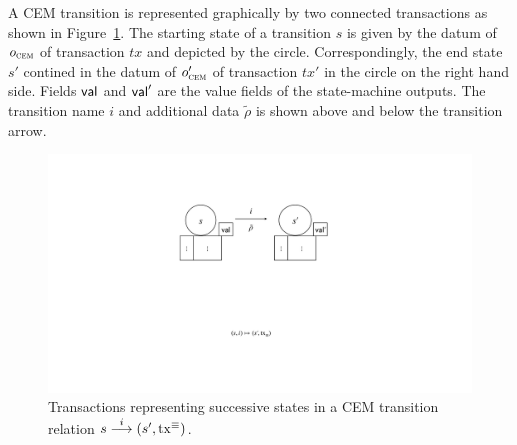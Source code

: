 A CEM transition is represented graphically by two connected transactions as
shown in Figure~\ref{fig:state-transition}. The starting state of a transition
$s$ is given by the datum of $o_{\textsc{cem}}$ of transaction $tx$ and depicted by the
circle. Correspondingly, the end state $s'$ contined in the datum of $o_{\textsc{cem}}'$
of transaction $tx'$ in the circle on the right hand side. Fields $\mathsf{val}$ and
$\mathsf{val}'$ are the value fields of the state-machine outputs. The transition name
$i$ and additional data $\tilde \rho$ is shown above and below the transition
arrow.

\begin{figure}[h]
  \centering
  \includegraphics[scale=.2,width=\textwidth/2]{figures/state-transition_cropped.pdf}
  \caption{Transactions representing successive states in a CEM
    transition relation \({s}\overset{i}\longrightarrow(s', \mathrm{tx}^\equiv)\).}\label{fig:state-transition}
\end{figure}

